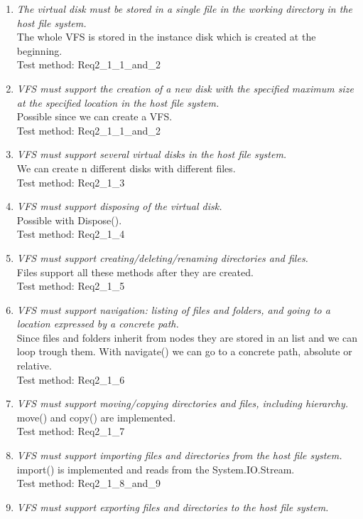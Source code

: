 \documentclass[a4paper,12pt]{article}
\begin{document}
\begin{enumerate}
	\item \emph{The virtual disk must be stored in a single file in the working directory in the host file system.}\\
		The whole VFS is stored in the instance disk which is created at the beginning.\\
		Test method: Req2\_1\_1\_and\_2
	\item \emph{VFS must support the creation of a new disk with the specified maximum size at the specified
location in the host file system.}\\
		Possible since we can create a VFS.\\
		Test method: Req2\_1\_1\_and\_2
	\item \emph{VFS must support several virtual disks in the host file system.}\\
		We can create n different disks with different files.\\
		Test method: Req2\_1\_3
	\item \emph{VFS must support disposing of the virtual disk.}\\
		Possible with Dispose().\\
		Test method: Req2\_1\_4
	\item \emph{VFS must support creating/deleting/renaming directories and files.}\\
		Files support all these methods after they are created.\\
		Test method: Req2\_1\_5
	\item \emph{VFS must support navigation: listing of files and folders, and going to a location expressed by a
concrete path.}\\
		Since files and folders inherit from nodes they are stored in an list and we can loop trough them. With navigate() we can go to a concrete path, absolute or relative.\\
		Test method: Req2\_1\_6
	\item \emph{VFS must support moving/copying directories and files, including hierarchy.}\\
		move() and copy() are implemented.\\
		Test method: Req2\_1\_7
	\item \emph{VFS must support importing files and directories from the host file system.}\\
		import() is implemented and reads from the System.IO.Stream.\\
		Test method: Req2\_1\_8\_and\_9
	\item \emph{VFS must support exporting files and directories to the host file system.}\\

\end{enumerate}
\end{document}
